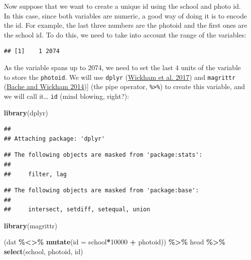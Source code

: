 \documentclass[
]{book}
\newenvironment{Shaded}{\begin{snugshade}}{\end{snugshade}}
\newcommand{\AttributeTok}[1]{\textcolor[rgb]{0.13,0.29,0.53}{#1}}
\newcommand{\DecValTok}[1]{\textcolor[rgb]{0.00,0.00,0.81}{#1}}
\newcommand{\FunctionTok}[1]{\textcolor[rgb]{0.13,0.29,0.53}{\textbf{#1}}}
\newcommand{\NormalTok}[1]{#1}
\newcommand{\OtherTok}[1]{\textcolor[rgb]{0.56,0.35,0.01}{#1}}
\newcommand{\SpecialCharTok}[1]{\textcolor[rgb]{0.81,0.36,0.00}{\textbf{#1}}}
\begin{document}
Now suppose that we want to create a unique id using the school and photo id. In this case, since both variables are numeric, a good way of doing it is to encode the id. For example, the last three numbers are the photoid and the first ones are the school id. To do this, we need to take into account the range of the variables:

\begin{Shaded}
\end{Shaded}

\begin{verbatim}
## [1]    1 2074
\end{verbatim}

As the variable spans up to 2074, we need to set the last 4 units of the variable to store the \texttt{photoid}. We will use \texttt{dplyr} (\protect\hyperlink{ref-R-dplyr}{Wickham et al. 2017}) and \texttt{magrittr} (\protect\hyperlink{ref-R-magrittr}{Bache and Wickham 2014}){]} (the pipe operator, \texttt{\%\textgreater{}\%}) to create this variable, and we will call it\ldots{} \texttt{id} (mind blowing, right?):

\begin{Shaded}
\begin{Highlighting}[]
\FunctionTok{library}\NormalTok{(dplyr)}
\end{Highlighting}
\end{Shaded}

\begin{verbatim}
## 
## Attaching package: 'dplyr'
\end{verbatim}

\begin{verbatim}
## The following objects are masked from 'package:stats':
## 
##     filter, lag
\end{verbatim}

\begin{verbatim}
## The following objects are masked from 'package:base':
## 
##     intersect, setdiff, setequal, union
\end{verbatim}

\begin{Shaded}
\begin{Highlighting}[]
\FunctionTok{library}\NormalTok{(magrittr)}

\NormalTok{(dat }\SpecialCharTok{\%\textless{}\textgreater{}\%} \FunctionTok{mutate}\NormalTok{(}\AttributeTok{id =}\NormalTok{ school}\SpecialCharTok{*}\DecValTok{10000} \SpecialCharTok{+}\NormalTok{ photoid)) }\SpecialCharTok{\%\textgreater{}\%}
\NormalTok{  head }\SpecialCharTok{\%\textgreater{}\%}
  \FunctionTok{select}\NormalTok{(school, photoid, id)}
\end{Highlighting}
\end{Shaded}
\end{document}
